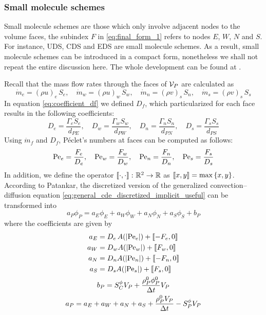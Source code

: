 
\subsubsection{Small molecule schemes}

Small molecule schemes are those which only involve adjacent nodes to the volume
faces, \ie the subindex $F$ in \eqref{eq:final_form_1} refers to nodes $E$, $W$,
$N$ and $S$. For instance, UDS, CDS and EDS are small molecule schemes. As a
result, small molecule schemes can be introduced in a compact form, nonetheless
we shall not repeat the entire discussion here. The whole development can be
found at \cite{patankar2008numerical}. 

Recall that the mass flow rates through the faces of $\mathcal{V}_{P}$ are calculated
as
\begin{equation}
	\dot{m}_e = (\rho u)_e \, S_e, \quad
	\dot{m}_w = (\rho u)_w \, S_w, \quad
	\dot{m}_n = (\rho v)_s \, S_n, \quad
	\dot{m}_s = (\rho v)_s \, S_s
\end{equation}
In equation \eqref{eq:coefficient_df} we defined $D_f$, which particularized for
each face results in the following coefficients:
\begin{equation}
	D_e = \frac{\Gamma_e S_e}{d_{PE}}, \quad
	D_w = \frac{\Gamma_w S_w}{d_{PW}}, \quad
	D_n = \frac{\Gamma_n S_n}{d_{PN}}, \quad
	D_s = \frac{\Gamma_s S_s}{d_{PS}}
\end{equation}
Using $\dot{m}_f$ and $D_f$, Péclet's numbers at faces can be computed as follows:
\begin{equation}
	\mathrm{Pe}_e = \frac{F_e}{D_e}, \quad
	\mathrm{Pe}_w = \frac{F_w}{D_w}, \quad
	\mathrm{Pe}_n = \frac{F_n}{D_n}, \quad
	\mathrm{Pe}_s = \frac{F_s}{D_s}
\end{equation}
In addition, we define the operator $\left\llbracket \cdot, \cdot \right\rrbracket \colon \mathbb{R}^2 \to
\mathbb{R}$ as $\left\llbracket x, y \right\rrbracket = \max{\{x, y\}}$. According to Patankar, the discretized
version of the generalized convection--diffusion equation
\eqref{eq:general_cde_discretized_implicit_useful} can be transformed into
\begin{equation} \label{eq:small_molecule_schemes}
	a_P \phi_P = a_E \phi_E + a_W \phi_W + a_N \phi_N + a_S \phi_S + b_P
\end{equation}
where the coefficients are given by
\begin{gather}
	\begin{align}
		a_E &= D_e \, A(\abs{\mathrm{Pe}_e}) + \left\llbracket -F_e, 0 \right\rrbracket 	\\
		a_W &= D_w A(\abs{\mathrm{Pe}_w}) + \left\llbracket F_w, 0 \right\rrbracket 	\\
		a_N &= D_n A(\abs{\mathrm{Pe}_n}) + \left\llbracket -F_n, 0 \right\rrbracket	\\
		a_S &= D_s A(\abs{\mathrm{Pe}_s}) + \left\llbracket F_s, 0 \right\rrbracket
	\end{align} \\
	b_P = S_C^\phi V_P + \frac{\rho_P^0 \phi_P^0}{\Delta t} V_P \\
	a_P = a_E + a_W + a_N + a_S + \frac{\rho_P^0 V_P}{\Delta t} - S_P^\phi V_P \label{eq:small_molecule_ap}
\end{gather}
